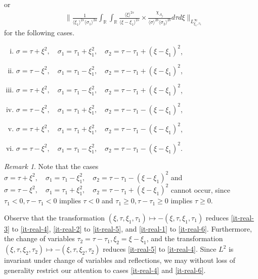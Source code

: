 \documentclass[12pt,reqno]{amsart}
\numberwithin{equation}{section}  %
\numberwithin{figure}{section}
\newcommand{\rr}{\mathbb{R}}
\theoremstyle{plain}
\theoremstyle{definition}
\theoremstyle{remark}
\newtheorem{remark}{Remark}
\begin{document}
%
%
or 
\begin{equation}
\begin{split}
  & \| \frac{1}{\langle \xi_{1} \rangle ^{2s}
  \langle \sigma_{1} \rangle
  ^{2a}} \int_{\rr} \int_{\rr} \frac{\langle \xi \rangle ^{2s}}{\langle
  \xi - \xi_{1}\rangle ^{2s}}  \times \frac{\chi_{A_{j}}}{\langle
  \sigma \rangle ^{2b} \langle \sigma_{2} \rangle ^{2b}} d \tau d \xi
  \|_{L^{\infty}_{\xi_{1}, \tau_{1}}}
\end{split}
\end{equation}
%
%
for the following cases.
\begin{enumerate}[(i)]
    \item $ \sigma=\tau+\xi^2,\quad \sigma_1=\tau_1+\xi_1^2,\quad \sigma_2=\tau -
      \tau_1+(\xi - \xi_1)^2$,
\label{it-real-1}
    \item $ \sigma=\tau-\xi^2,\quad \sigma_1=\tau_1-\xi_1^2,\quad \sigma_2=\tau - \tau_1+(\xi - \xi_1)^2$,
\label{it-real-2}
    \item  $\sigma=\tau+\xi^2,\quad \sigma_1=\tau_1-\xi_1^2,\quad \sigma_2=\tau - \tau_1+(\xi - \xi_1)^2$,
      \label{it-real-3}
    \item $\sigma=\tau-\xi^2,\quad \sigma_1=\tau_1+\xi_1^2,\quad \sigma_2=\tau - \tau_1-(\xi - \xi_1)^2$,
\label{it-real-4}
    \item $\sigma=\tau+\xi^2,\quad \sigma_1=\tau_1+\xi_1^2,\quad \sigma_2=\tau - \tau_1-(\xi - \xi_1)^2$,
\label{it-real-5}
    \item $\sigma=\tau-\xi^2,\quad \sigma_1=\tau_1-\xi_1^2,\quad \sigma_2=\tau - \tau_1-(\xi - \xi_1)^2$.
\label{it-real-6}
\end{enumerate}
%
%
\begin{framed}
\begin{remark}
Note that the cases $\sigma=\tau+\xi^2,\quad \sigma_1=\tau_1-\xi_1^2,\quad
\sigma_2=\tau - \tau_1-(\xi - \xi_1)^2$ and $\sigma=\tau-\xi^2,\quad
\sigma_1=\tau_1+\xi_1^2,\quad \sigma_2=\tau - \tau_1+(\xi - \xi_1)^2$ cannot occur, since
$\tau_1< 0, \tau-\tau_1< 0$ implies $\tau<0$ and $\tau_1\geq 0, \tau-\tau_1\geq
0$ implies $\tau\geq 0$.
\end{remark}
\end{framed}
%
Observe that the transformation $(\xi, \tau, \xi_{1}, \tau_{1}) \mapsto -(\xi, \tau,
\xi_{1}, \tau_{1})$ reduces \eqref{it-real-3} to \eqref{it-real-4}, \eqref{it-real-2} to
\eqref{it-real-5}, and \eqref{it-real-1} to \eqref{it-real-6}. Furthermore, the change of
variables $\tau_{2} = \tau - \tau_{1}, \xi_{2} = \xi - \xi_{1}$, and the
transformation $(\xi, \tau, \xi_{2}, \tau_{2}) \mapsto - (\xi, \tau, \xi_{2},
\tau_{2})$ reduces \eqref{it-real-5} to \eqref{it-real-4}. Since $L^{2}$ is invariant
under change of variables and reflections, we may without loss of generality
restrict our attention to cases \eqref{it-real-4} and \eqref{it-real-6}.
\end{document}
